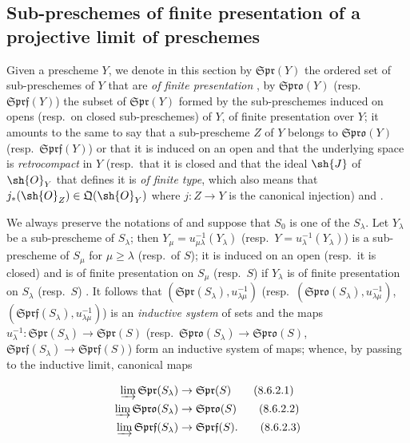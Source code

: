 \subsection{Sub-preschemes of finite presentation of a projective limit of preschemes}
\label{subsection:IV.8.6}

\begin{env}[8.6.1]
\label{IV.8.6.1}
Given a prescheme $Y$, we denote in this section by $\mathfrak{Spr}(Y)$ the ordered set
 of sub-preschemes of $Y$ that are \emph{of finite presentation}
, by $\mathfrak{Spro}(Y)$ (resp.\ $\mathfrak{Sprf}(Y)$) the subset of $\mathfrak{Spr}(Y)$ formed by the sub-preschemes induced on opens (resp.\ on closed sub-preschemes) of $Y$, of finite presentation over $Y$; it amounts to the same to say that a sub-prescheme $Z$ of $Y$ belongs to $\mathfrak{Spro}(Y)$ (resp.\ $\mathfrak{Sprf}(Y)$) or that it is induced on an open and that the underlying space is \emph{retrocompact} in $Y$ (resp.\ that it is closed and that the ideal $\sh{J}$ of $\sh{O}_Y$ that defines it is \emph{of finite type}, which also means that $j_*(\sh{O}_Z)\in\mathfrak{Q}(\sh{O}_Y)$ where $j:Z\to Y$ is the canonical injection)  and .
\end{env}

\begin{env}[8.6.2]
\label{IV.8.6.2}
We always preserve the notations of  and suppose that $S_0$ is one of the $S_\lambda$.
Let $Y_\lambda$ be a sub-prescheme of $S_\lambda$; then $Y_\mu=u_{\mu\lambda}^{-1}(Y_\lambda)$ (resp.\ $Y=u_\lambda^{-1}(Y_\lambda)$) is a sub-prescheme of $S_\mu$ for $\mu\geqslant\lambda$ (resp.\ of $S$); it is induced on an open (resp.\ it is closed) and is of finite presentation on $S_\mu$ (resp.\ $S$) if $Y_\lambda$ is of finite presentation on $S_\lambda$ (resp.\ $S$) . It follows that $(\mathfrak{Spr}(S_\lambda),u_{\lambda\mu}^{-1})$ (resp.\ $(\mathfrak{Spro}(S_\lambda),u_{\lambda\mu}^{-1})$, $(\mathfrak{Sprf}(S_\lambda),u_{\lambda\mu}^{-1})$) is an \emph{inductive system} of sets and the maps $u_\lambda^{-1}:\mathfrak{Spr}(S_\lambda)\to\mathfrak{Spr}(S)$ (resp.\ $\mathfrak{Spro}(S_\lambda)\to\mathfrak{Spro}(S)$, $\mathfrak{Sprf}(S_\lambda)\to\mathfrak{Sprf}(S)$) form an inductive system of maps; whence, by passing to the inductive limit, canonical maps
\end{env}

\begin{align}
  \varinjlim \mathfrak{Spr}(S_\lambda) &\to \mathfrak{Spr}(S) \tag{8.6.2.1}\label{IV.8.6.2.1}\\
  \varinjlim \mathfrak{Spro}(S_\lambda) &\to \mathfrak{Spro}(S) \tag{8.6.2.2}\label{IV.8.6.2.2}\\
  \varinjlim \mathfrak{Sprf}(S_\lambda) &\to \mathfrak{Sprf}(S). \tag{8.6.2.3}\label{IV.8.6.2.3}
\end{align}

